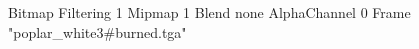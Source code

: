 {Bitmap
	{Filtering 1}
	{Mipmap 1}
	{Blend none}
	{AlphaChannel 0}
	{Frame "poplar_white3#burned.tga"}
}
